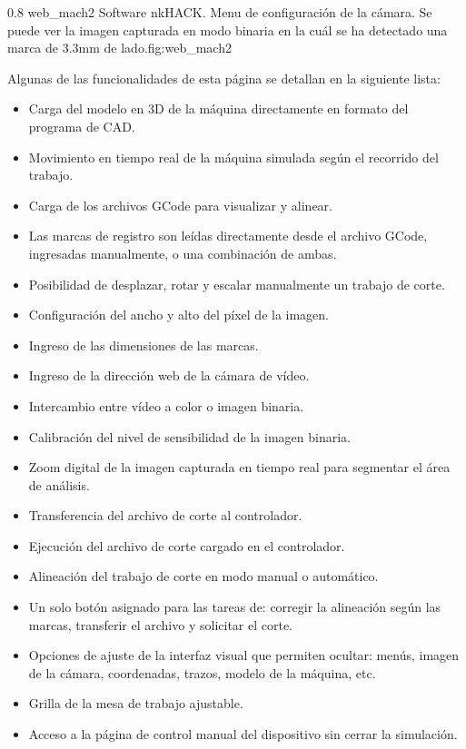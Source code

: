 \subfiga
{0.8} {web_mach2} {Software nkHACK. Menu de configuración de la cámara. Se puede ver la imagen capturada en modo binaria en la cuál se ha detectado una marca de 3.3mm de lado.}{fig:web_mach2}

Algunas de las funcionalidades de esta página se detallan en la siguiente lista:
\begin{itemize}
   \item{Carga del modelo en 3D de la máquina directamente en formato del programa de CAD.}
   \item{Movimiento en tiempo real de la máquina simulada según el recorrido del trabajo.}
   \item{Carga de los archivos GCode para visualizar y alinear.}
   \item{Las marcas de registro son leídas directamente desde el archivo GCode, ingresadas manualmente, o una combinación de ambas.}
   \item{Posibilidad de desplazar, rotar y escalar manualmente un trabajo de corte.}
   \item{Configuración del ancho y alto del píxel de la imagen.}
   \item{Ingreso de las dimensiones de las marcas.}
   \item{Ingreso de la dirección web de la cámara de vídeo.}
   \item{Intercambio entre vídeo a color o imagen binaria.}
   \item{Calibración del nivel de sensibilidad de la imagen binaria.}
   \item{Zoom digital de la imagen capturada en tiempo real para segmentar el área de análisis.}
   \item{Transferencia del archivo de corte al controlador.}
   \item{Ejecución del archivo de corte cargado en el controlador.}
   \item{Alineación del trabajo de corte en modo manual o automático.}
   \item{Un solo botón asignado para las tareas de: corregir la alineación según las marcas, transferir el archivo y solicitar el corte.}
   \item{Opciones de ajuste de la interfaz visual que permiten ocultar: menús, imagen de la cámara, coordenadas, trazos, modelo de la máquina, etc.}
   \item{Grilla de la mesa de trabajo ajustable.}
   \item{Acceso a la página de control manual del dispositivo sin cerrar la simulación.}
\end{itemize}


